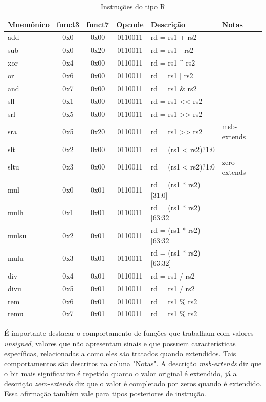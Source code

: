 \documentclass[
	12pt,				%
	oneside,
	a4paper,			%
	english,			%
	french,				%
	spanish,			%
	brazil,				%
	]{abntex2}
\begin{document}
\begin{table}[H]
\centering
\caption{Instruções do tipo R} \label{tab:RType}
\ABNTEXfontereduzida
\begin{tabular}{|l|c|c|c|l|l|}
\multicolumn{1}{l}{Mnemônico} & \multicolumn{1}{c}{funct3} & \multicolumn{1}{c}{funct7} & \multicolumn{1}{c}{Opcode} & \multicolumn{1}{l}{Descrição} & \multicolumn{1}{l}{Notas} \\ \hline
add   & 0x0 & 0x00 & 0110011 & rd = rs1 + rs2 & \\ \hline
sub   & 0x0 & 0x20 & 0110011 & rd = rs1 - rs2 & \\ \hline
xor   & 0x4 & 0x00 & 0110011 & rd = rs1 \textasciicircum{} rs2 & \\ \hline
or    & 0x6 & 0x00 & 0110011 & rd = rs1 | rs2 & \\ \hline
and   & 0x7 & 0x00 & 0110011 & rd = rs1 \& rs2 & \\ \hline
sll   & 0x1 & 0x00 & 0110011 & rd = rs1 \textless{}\textless{} rs2 & \\ \hline
srl   & 0x5 & 0x00 & 0110011 & rd = rs1 \textgreater{}\textgreater{} rs2 & \\ \hline
sra   & 0x5 & 0x20 & 0110011 & rd = rs1 \textgreater{}\textgreater{} rs2 & msb-extends \\ \hline
slt   & 0x2 & 0x00 & 0110011 & rd = (rs1 \textless{} rs2)?1:0 & \\ \hline
sltu  & 0x3 & 0x00 & 0110011 & rd = (rs1 \textless{} rs2)?1:0 & zero-extends \\ \hline
mul   & 0x0 & 0x01 & 0110011 & rd = (rs1 * rs2)[31:0] & \\ \hline
mulh  & 0x1 & 0x01 & 0110011 & rd = (rs1 * rs2)[63:32] & \\ \hline
mulsu & 0x2 & 0x01 & 0110011 & rd = (rs1 * rs2)[63:32] & \\ \hline
mulu  & 0x3 & 0x01 & 0110011 & rd = (rs1 * rs2)[63:32] & \\ \hline
div   & 0x4 & 0x01 & 0110011 & rd = rs1 / rs2 & \\ \hline
divu  & 0x5 & 0x01 & 0110011 & rd = rs1 / rs2 & \\ \hline
rem   & 0x6 & 0x01 & 0110011 & rd = rs1 \% rs2 & \\ \hline
remu  & 0x7 & 0x01 & 0110011 & rd = rs1 \% rs2 & \\ \hline
\end{tabular}
\end{table}

É importante destacar o comportamento de funções que trabalham com valores \textit{unsigned}, valores que não apresentam sinais e que possuem características específicas, relacionadas a como eles são tratados quando extendidos. Tais comportamentos são descritos na coluna "Notas". A descrição \textit{msb-extends} diz que o bit mais significativo é repetido quanto o valor original é extendido, já a descrição \textit{zero-extends} diz que o valor é completado por zeros quando é extendido. Essa afirmação também vale para tipos posteriores de instrução.
\end{document}
